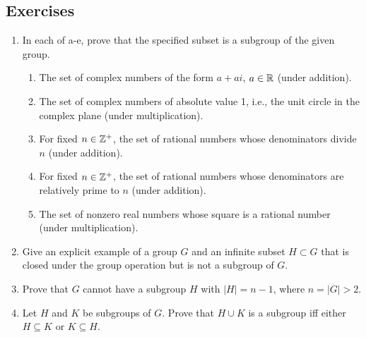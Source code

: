 \documentclass[../notes.tex]{subfiles}
\begin{document}
\subsection*{Exercises}
\begin{enumerate}[label={\textbf{\arabic*.}}]
    \item {}In each of a-e, prove that the specified subset is a subgroup of the given group.
    \begin{enumerate}[label={\textbf{(\alph*)}}]
        \item The set of complex numbers of the form $a+ai$, $a\in\mathbb{R}$ (under addition).
        \item The set of complex numbers of absolute value 1, i.e., the unit circle in the complex plane (under multiplication).
        \item For fixed $n\in\mathbb{Z}^+$, the set of rational numbers whose denominators divide $n$ (under addition).
        \item For fixed $n\in\mathbb{Z}^+$, the set of rational numbers whose denominators are relatively prime to $n$ (under addition).
        \item The set of nonzero real numbers whose square is a rational number (under multiplication).
    \end{enumerate}
    \setcounter{enumi}{3}
    \item Give an explicit example of a group $G$ and an infinite subset $H\subset G$ that is closed under the group operation but is not a subgroup of $G$.
    \item Prove that $G$ cannot have a subgroup $H$ with $|H|=n-1$, where $n=|G|>2$.
    \setcounter{enumi}{7}
    \item Let $H$ and $K$ be subgroups of $G$. Prove that $H\cup K$ is a subgroup iff either $H\subseteq K$ or $K\subseteq H$.
\end{enumerate}
\end{document}
